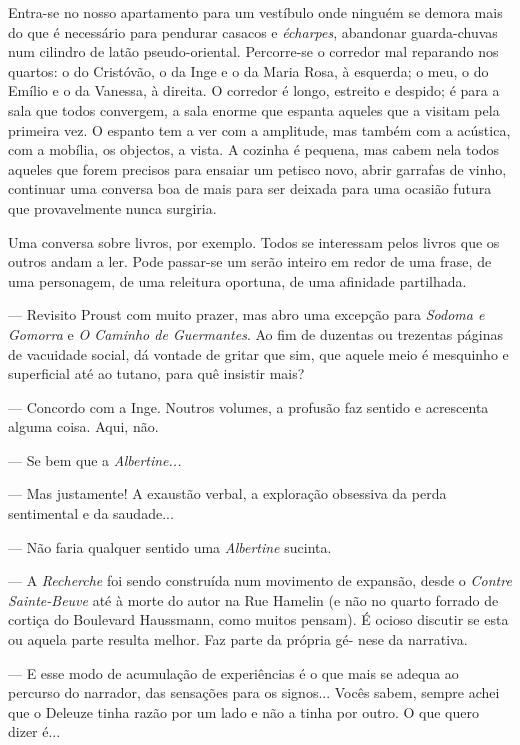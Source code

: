 Entra-se no nosso apartamento para um vestíbulo onde ninguém se demora
mais do que é necessário para pendurar casacos e \emph{écharpes},
abandonar guarda-chuvas num cilindro de latão pseudo-oriental.
Percorre-se o corredor mal reparando nos quartos: o do Cristóvão, o da
Inge e o da Maria Rosa, à esquerda; o meu, o do Emílio e o da Vanessa, à
direita. O corredor é longo, estreito e despido; é para a sala que todos
convergem, a sala enorme que espanta aqueles que a visitam pela primeira
vez. O espanto tem a ver com a amplitude, mas também com a acústica, com
a mobília, os objectos, a vista. A cozinha é pequena, mas cabem nela
todos aqueles que forem precisos para ensaiar um petisco novo, abrir
garrafas de vinho, continuar uma conversa boa de mais para ser deixada
para uma ocasião futura que provavelmente nunca surgiria.

Uma conversa sobre livros, por exemplo. Todos se interessam pelos
livros que os outros andam a ler. Pode passar-se um serão inteiro em
redor de uma frase, de uma personagem, de uma releitura oportuna, de uma
afinidade partilhada.

--- Revisito Proust com muito prazer, mas abro uma excepção para
  \emph{Sodoma e Gomorra }e \emph{O Caminho de Guermantes}. Ao fim de
  duzentas ou trezentas páginas de vacuidade social, dá vontade de
  gritar que sim, que aquele meio é mesquinho e
superficial até ao tutano, para quê insistir mais?

--- Concordo com a Inge. Noutros volumes, a profusão faz sentido e
  acrescenta alguma coisa. Aqui, não.

--- Se bem que a \emph{Albertine...}

--- Mas justamente! A exaustão verbal, a exploração obsessiva da perda
  sentimental e da saudade...

--- Não faria qualquer sentido uma \emph{Albertine }sucinta.

--- A \emph{Recherche }foi sendo construída num movimento de expansão,
  desde o \emph{Contre Sainte-Beuve }até à morte do autor na Rue Hamelin
  (e não no quarto forrado de cortiça do Boulevard Haussmann, como
  muitos pensam). É ocioso discutir se esta ou aquela parte resulta
  melhor. Faz parte da própria gé- nese da narrativa.

--- E esse modo de acumulação de experiências é o que mais se adequa ao
  percurso do narrador, das sensações para os signos... Vocês sabem,
  sempre achei que o Deleuze tinha razão por um lado e não a tinha por
  outro. O que quero dizer é...

